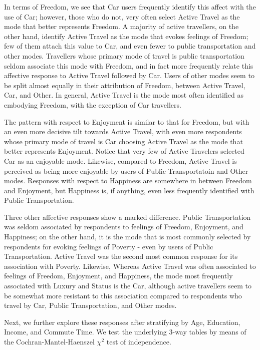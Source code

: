 \documentclass[]{elsarticle} %
\begin{document}
In terms of Freedom, we see that Car users frequently identify this
affect with the use of Car; however, those who do not, very often select
Active Travel as the mode that better represents Freedom. A majority of
active travellers, on the other hand, identify Active Travel as the mode
that evokes feelings of Freedom; few of them attach this value to Car,
and even fewer to public transportation and other modes. Travellers
whose primary mode of travel is public transportation seldom associate
this mode with Freedom, and in fact more frequently relate this
affective response to Active Travel followed by Car. Users of other
modes seem to be split almost equally in their attribution of Freedom,
between Active Travel, Car, and Other. In general, Active Travel is the
mode most often identified as embodying Freedom, with the exception of
Car travellers.

The pattern with respect to Enjoyment is similar to that for Freedom,
but with an even more decisive tilt towards Active Travel, with even
more respondents whose primary mode of travel is Car choosing Active
Travel as the mode that better represents Enjoyment. Notice that very
few of Active Travelers selected Car as an enjoyable mode. Likewise,
compared to Freedom, Active Travel is perceived as being more enjoyable
by users of Public Transportatoin and Other modes. Responses with
respect to Happiness are somewhere in between Freedom and Enjoyment, but
Happiness is, if anything, even less frequently identified with Public
Transportation.

Three other affective responses show a marked difference. Public
Transportation was seldom associated by respondents to feelings of
Freedom, Enjoyment, and Happiness; on the other hand, it is the mode
that is most commonly selected by respondents for evoking feelings of
Poverty - even by users of Public Transportation. Active Travel was the
second most common response for its association with Poverty. Likewise,
Whereas Active Travel was often associated to feelings of Freedom,
Enjoyment, and Happiness, the mode most frequently associated with
Luxury and Status is the Car, although active travellers seem to be
somewhat more resistant to this association compared to respondents who
travel by Car, Public Transportation, and Other modes.

Next, we further explore these responses after stratifying by Age,
Education, Income, and Commute Time. We test the underlying 3-way tables
by means of the Cochran-Mantel-Haenszel \(\chi^2\) test of independence.
\end{document}
